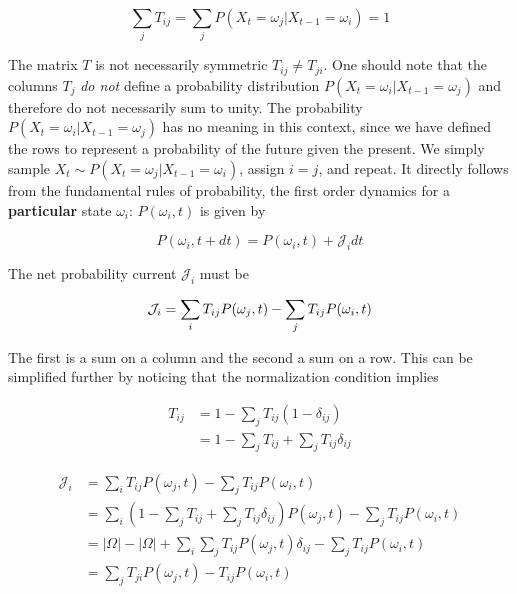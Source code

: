 \documentclass{ucetd}
\begin{document}
\begin{equation*}
\sum_{j}T_{ij} = \sum_{j} P(X_{t} = \omega_{j} | X_{t-1} = \omega_{i}) = 1
\end{equation*}

The matrix $T$ is not necessarily symmetric $T_{ij} \neq T_{ji}$. One should note that the columns $T_{j}$ \emph{do not} define a probability distribution $P(X_{t} = \omega_{i} | X_{t-1} = \omega_{j})$ and therefore do not necessarily sum to unity. The probability $P(X_{t} = \omega_{i} | X_{t-1} = \omega_{j})$ has no meaning in this context, since we have defined the rows to represent a probability of the future given the present. We simply sample $X_{t} \sim P(X_{t} = \omega_{j} | X_{t-1} = \omega_{i})$, assign $i=j$, and repeat. It directly follows from the fundamental rules of probability, the first order dynamics for a \textbf{particular} state $\omega_{i}$: $P(\omega_{i},t)$ is given by

\begin{equation}
P(\omega_{i},t+dt) = P(\omega_{i},t) + \mathcal{J}_{i}dt
\end{equation}

The net probability current $\mathcal{J}_{i}$ must be 

\begin{equation*}
\mathcal{J}_{i} = \sum_{i}T_{ij}P(\omega_{j},t) - \sum_{j}T_{ij}P(\omega_{i},t)\\
\end{equation*}

The first is a sum on a column and the second a sum on a row. This can be simplified further by noticing that the normalization condition implies

\begin{align*}
T_{ij} &= 1 - \sum_{j}T_{ij}(1-\delta_{ij})\\
&= 1 - \sum_{j}T_{ij} + \sum_{j}T_{ij}\delta_{ij}
\end{align*}


\begin{align*}
\mathcal{J}_{i} &= \sum_{i}T_{ij}P(\omega_{j},t) - \sum_{j}T_{ij}P(\omega_{i},t)\\
&= \sum_{i}\left(1 - \sum_{j}T_{ij} + \sum_{j}T_{ij}\delta_{ij}\right)P(\omega_{j},t) - \sum_{j}T_{ij}P(\omega_{i},t)\\
&= |\Omega| - |\Omega| + \sum_{i}\sum_{j}T_{ij}P(\omega_{j},t)\delta_{ij} - \sum_{j}T_{ij}P(\omega_{i},t)\\
&= \sum_{j}T_{ji}P(\omega_{j},t) - T_{ij}P(\omega_{i},t)\\
\end{align*}
\end{document}
